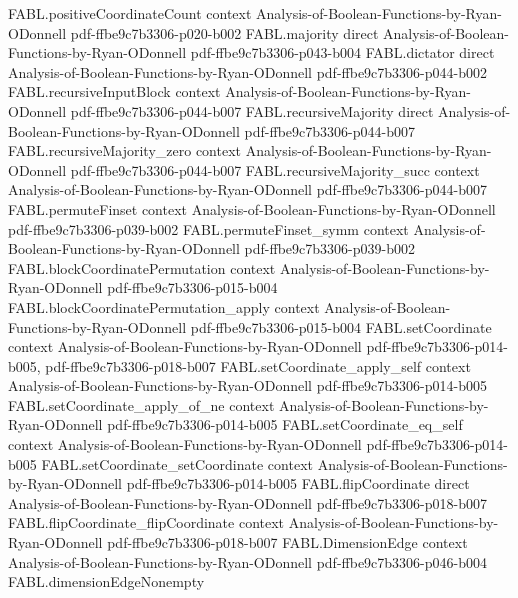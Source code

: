 \begin{theorem}
\proofstep
  {FABL.positiveCoordinateCount}
  {context}
  {Analysis-of-Boolean-Functions-by-Ryan-ODonnell}
  {pdf-ffbe9c7b3306-p020-b002}
\proofstep
  {FABL.majority}
  {direct}
  {Analysis-of-Boolean-Functions-by-Ryan-ODonnell}
  {pdf-ffbe9c7b3306-p043-b004}
\proofstep
  {FABL.dictator}
  {direct}
  {Analysis-of-Boolean-Functions-by-Ryan-ODonnell}
  {pdf-ffbe9c7b3306-p044-b002}
\proofstep
  {FABL.recursiveInputBlock}
  {context}
  {Analysis-of-Boolean-Functions-by-Ryan-ODonnell}
  {pdf-ffbe9c7b3306-p044-b007}
\proofstep
  {FABL.recursiveMajority}
  {direct}
  {Analysis-of-Boolean-Functions-by-Ryan-ODonnell}
  {pdf-ffbe9c7b3306-p044-b007}
\proofstep
  {FABL.recursiveMajority_zero}
  {context}
  {Analysis-of-Boolean-Functions-by-Ryan-ODonnell}
  {pdf-ffbe9c7b3306-p044-b007}
\proofstep
  {FABL.recursiveMajority_succ}
  {context}
  {Analysis-of-Boolean-Functions-by-Ryan-ODonnell}
  {pdf-ffbe9c7b3306-p044-b007}
\proofstep
  {FABL.permuteFinset}
  {context}
  {Analysis-of-Boolean-Functions-by-Ryan-ODonnell}
  {pdf-ffbe9c7b3306-p039-b002}
\proofstep
  {FABL.permuteFinset_symm}
  {context}
  {Analysis-of-Boolean-Functions-by-Ryan-ODonnell}
  {pdf-ffbe9c7b3306-p039-b002}
\proofstep
  {FABL.blockCoordinatePermutation}
  {context}
  {Analysis-of-Boolean-Functions-by-Ryan-ODonnell}
  {pdf-ffbe9c7b3306-p015-b004}
\proofstep
  {FABL.blockCoordinatePermutation_apply}
  {context}
  {Analysis-of-Boolean-Functions-by-Ryan-ODonnell}
  {pdf-ffbe9c7b3306-p015-b004}
\proofstep
  {FABL.setCoordinate}
  {context}
  {Analysis-of-Boolean-Functions-by-Ryan-ODonnell}
  {pdf-ffbe9c7b3306-p014-b005,
    pdf-ffbe9c7b3306-p018-b007}
\proofstep
  {FABL.setCoordinate_apply_self}
  {context}
  {Analysis-of-Boolean-Functions-by-Ryan-ODonnell}
  {pdf-ffbe9c7b3306-p014-b005}
\proofstep
  {FABL.setCoordinate_apply_of_ne}
  {context}
  {Analysis-of-Boolean-Functions-by-Ryan-ODonnell}
  {pdf-ffbe9c7b3306-p014-b005}
\proofstep
  {FABL.setCoordinate_eq_self}
  {context}
  {Analysis-of-Boolean-Functions-by-Ryan-ODonnell}
  {pdf-ffbe9c7b3306-p014-b005}
\proofstep
  {FABL.setCoordinate_setCoordinate}
  {context}
  {Analysis-of-Boolean-Functions-by-Ryan-ODonnell}
  {pdf-ffbe9c7b3306-p014-b005}
\proofstep
  {FABL.flipCoordinate}
  {direct}
  {Analysis-of-Boolean-Functions-by-Ryan-ODonnell}
  {pdf-ffbe9c7b3306-p018-b007}
\proofstep
  {FABL.flipCoordinate_flipCoordinate}
  {context}
  {Analysis-of-Boolean-Functions-by-Ryan-ODonnell}
  {pdf-ffbe9c7b3306-p018-b007}
\proofstep
  {FABL.DimensionEdge}
  {context}
  {Analysis-of-Boolean-Functions-by-Ryan-ODonnell}
  {pdf-ffbe9c7b3306-p046-b004}
\proofstep
  {FABL.dimensionEdgeNonempty}

\end{theorem}
